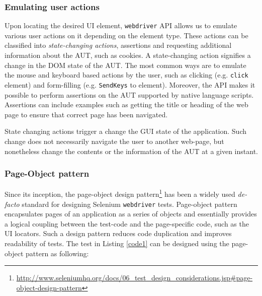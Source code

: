 \subsubsection*{Emulating user actions}
\label{sssec:emulatingActions}
Upon locating the desired UI element, \texttt{webdriver} API allows us to emulate various user actions on it depending on the element type. These actions can be classified into \textit{state-changing actions}, assertions and requesting additional information about the AUT, such as cookies. A state-changing action signifies a change in the DOM state of the AUT. The most common ways are to emulate the mouse and keyboard based actions by the user, such as clicking (e.g. \texttt{click} element) and form-filling (e.g. \texttt{SendKeys} to element). Moreover, the API makes it possible to perform assertions on the AUT supported by native language scripts. Assertions can include examples such as getting the title or heading of the web page to ensure that correct page has been navigated. 

State changing actions trigger a change the GUI state of the application. Such change does not necessarily navigate the user to another web-page, but nonetheless change the contents or the information of the AUT at a given instant.

\subsubsection*{Page-Object pattern}
\label{page-object}
Since its inception, the page-object design pattern\footnote{\url{http://www.seleniumhq.org/docs/06_test_design_considerations.jsp\#page-object-design-pattern}} has been a widely used \textit{de-facto} standard for designing Selenium \texttt{webdriver} tests. 
Page-object pattern encapsulates pages of an application as a series of objects and essentially provides a logical coupling between the test-code and the page-specific code, such as the UI locators. Such a design pattern reduces code duplication and improves readability of tests. The test in Listing \ref{code1} can be designed using the page-object pattern as following: 

